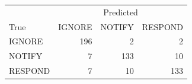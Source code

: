 \begin{tabular}{lrrr}
\toprule
 & \multicolumn{3}{c}{Predicted} \\
True & IGNORE & NOTIFY & RESPOND \\
\midrule
IGNORE & 196 & 2 & 2 \\
NOTIFY & 7 & 133 & 10 \\
RESPOND & 7 & 10 & 133 \\
\bottomrule
\end{tabular}
